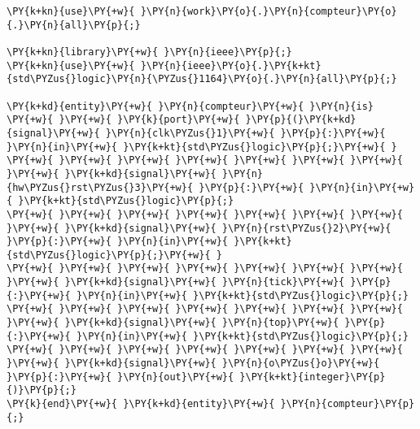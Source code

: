 \begin{Verbatim}[commandchars=\\\{\}]
\PY{k+kn}{use}\PY{+w}{ }\PY{n}{work}\PY{o}{.}\PY{n}{compteur}\PY{o}{.}\PY{n}{all}\PY{p}{;}

\PY{k+kn}{library}\PY{+w}{ }\PY{n}{ieee}\PY{p}{;}
\PY{k+kn}{use}\PY{+w}{ }\PY{n}{ieee}\PY{o}{.}\PY{k+kt}{std\PYZus{}logic}\PY{n}{\PYZus{}1164}\PY{o}{.}\PY{n}{all}\PY{p}{;}

\PY{k+kd}{entity}\PY{+w}{ }\PY{n}{compteur}\PY{+w}{ }\PY{n}{is}
\PY{+w}{ }\PY{+w}{ }\PY{k}{port}\PY{+w}{ }\PY{p}{(}\PY{k+kd}{signal}\PY{+w}{ }\PY{n}{clk\PYZus{}1}\PY{+w}{ }\PY{p}{:}\PY{+w}{ }\PY{n}{in}\PY{+w}{ }\PY{k+kt}{std\PYZus{}logic}\PY{p}{;}\PY{+w}{ }
\PY{+w}{ }\PY{+w}{ }\PY{+w}{ }\PY{+w}{ }\PY{+w}{ }\PY{+w}{ }\PY{+w}{ }\PY{+w}{ }\PY{k+kd}{signal}\PY{+w}{ }\PY{n}{hw\PYZus{}rst\PYZus{}3}\PY{+w}{ }\PY{p}{:}\PY{+w}{ }\PY{n}{in}\PY{+w}{ }\PY{k+kt}{std\PYZus{}logic}\PY{p}{;}
\PY{+w}{ }\PY{+w}{ }\PY{+w}{ }\PY{+w}{ }\PY{+w}{ }\PY{+w}{ }\PY{+w}{ }\PY{+w}{ }\PY{k+kd}{signal}\PY{+w}{ }\PY{n}{rst\PYZus{}2}\PY{+w}{ }\PY{p}{:}\PY{+w}{ }\PY{n}{in}\PY{+w}{ }\PY{k+kt}{std\PYZus{}logic}\PY{p}{;}\PY{+w}{ }
\PY{+w}{ }\PY{+w}{ }\PY{+w}{ }\PY{+w}{ }\PY{+w}{ }\PY{+w}{ }\PY{+w}{ }\PY{+w}{ }\PY{k+kd}{signal}\PY{+w}{ }\PY{n}{tick}\PY{+w}{ }\PY{p}{:}\PY{+w}{ }\PY{n}{in}\PY{+w}{ }\PY{k+kt}{std\PYZus{}logic}\PY{p}{;}
\PY{+w}{ }\PY{+w}{ }\PY{+w}{ }\PY{+w}{ }\PY{+w}{ }\PY{+w}{ }\PY{+w}{ }\PY{+w}{ }\PY{k+kd}{signal}\PY{+w}{ }\PY{n}{top}\PY{+w}{ }\PY{p}{:}\PY{+w}{ }\PY{n}{in}\PY{+w}{ }\PY{k+kt}{std\PYZus{}logic}\PY{p}{;}
\PY{+w}{ }\PY{+w}{ }\PY{+w}{ }\PY{+w}{ }\PY{+w}{ }\PY{+w}{ }\PY{+w}{ }\PY{+w}{ }\PY{k+kd}{signal}\PY{+w}{ }\PY{n}{o\PYZus{}o}\PY{+w}{ }\PY{p}{:}\PY{+w}{ }\PY{n}{out}\PY{+w}{ }\PY{k+kt}{integer}\PY{p}{)}\PY{p}{;}
\PY{k}{end}\PY{+w}{ }\PY{k+kd}{entity}\PY{+w}{ }\PY{n}{compteur}\PY{p}{;}


\end{Verbatim}
